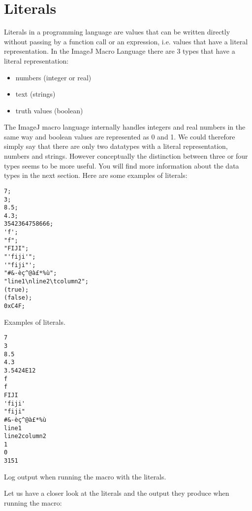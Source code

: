 \section{Literals}

Literals in a programming language are values that can be written directly without passing by a function call or an expression, i.e. values that have a literal representation. In the ImageJ Macro Language there are 3 types that have a literal representation:

\begin{itemize}
\item numbers (integer or real)
\item text (strings)
\item truth values (boolean)
\end{itemize}

The ImageJ macro language internally handles integers and real numbers in the same way and boolean values are represented as 0 and 1. We could therefore simply say that there are only two datatypes with a literal representation, numbers and strings. However conceptually the distinction between three or four types seems to be more useful. You will find more information about the data types in the next section. Here are some examples of literals:

\begin{listing}[H]
\begin{verbatim}
7;
3;
8.5;
4.3;
3542364758666;
'f';
"f";
"FIJI";
"'fiji'";
'"fiji"';
"#&-èç^@à£*%ù";
"line1\nline2\tcolumn2";
(true);
(false);
0xC4F;
\end{verbatim}
\caption{Examples of literals.}
\label{lst:literals}
\end{listing}

\begin{listing}[H]
\begin{verbatim}
7
3
8.5
4.3
3.5424E12
f
f
FIJI
'fiji'
"fiji"
#&-èç^@à£*%ù
line1
line2column2
1
0
3151
\end{verbatim}
\caption{Log output when running the macro with the literals.}
\label{lst:literals_log}
\end{listing}

Let us have a closer look at the literals and the output they produce when running the macro:

